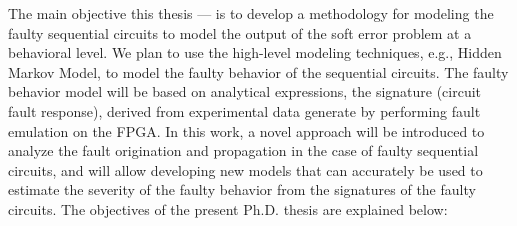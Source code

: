 The main objective this thesis --- is to develop a methodology for modeling the faulty sequential circuits to model the output of the soft error problem at a behavioral level. We plan to use the high-level modeling techniques, e.g., Hidden Markov Model, to model the faulty behavior of the sequential circuits. The faulty behavior model will be based on analytical expressions, the signature (circuit fault response), derived from  experimental data generate by performing fault emulation on the FPGA. In this work, a novel approach will be introduced to analyze the fault origination and propagation in the case of faulty sequential circuits, and will allow developing new models that can accurately be used to estimate the severity of the faulty behavior from the signatures of the faulty circuits. The objectives of the present Ph.D. thesis are explained below: 
